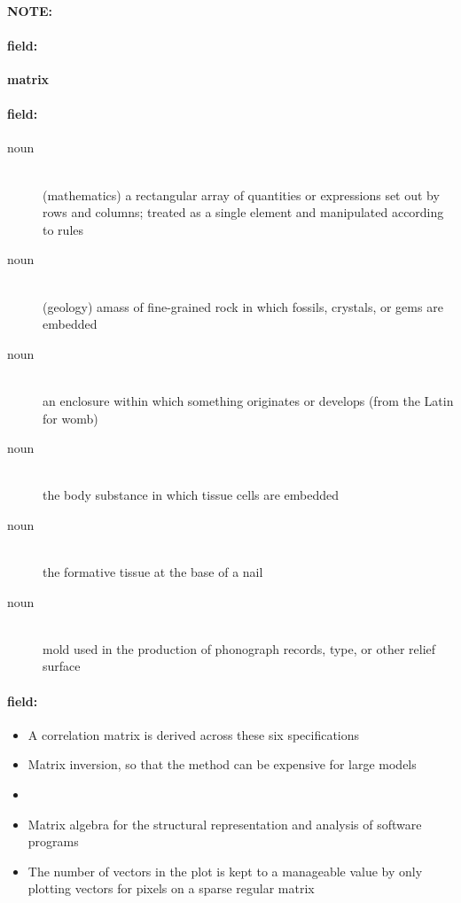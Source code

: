 \documentclass[12pt]{article}
\newenvironment{note}{\paragraph{NOTE:}}{}
\newenvironment{field}{\paragraph{field:}}{}
\begin{document}
\begin{note}
\begin{field}
\textbf{\large matrix}
\end{field}


\begin{field}
\begin{description}
\item[noun] \hfill \\ 
(mathematics) a rectangular array of quantities or expressions set out by rows and columns; treated as a single element and manipulated according to rules

\item[noun] \hfill \\ 
(geology) amass of fine-grained rock in which fossils, crystals, or gems are embedded

\item[noun] \hfill \\ 
an enclosure within which something originates or develops (from the Latin for womb)

\item[noun] \hfill \\ 
the body substance in which tissue cells are embedded

\item[noun] \hfill \\ 
the formative tissue at the base of a nail

\item[noun] \hfill \\ 
mold used in the production of phonograph records, type, or other relief surface

\end{description}
\end{field}

\begin{field}
\begin{itemize}
\item A correlation matrix is derived across these six specifications
\item Matrix inversion, so that the method can be expensive for large models
\item 
\item Matrix algebra for the structural representation and analysis of software programs
\item The number of vectors in the plot is kept to a manageable value by only plotting vectors for pixels on a sparse regular matrix
\end{itemize}
\end{field}
\end{note}
\end{document}
